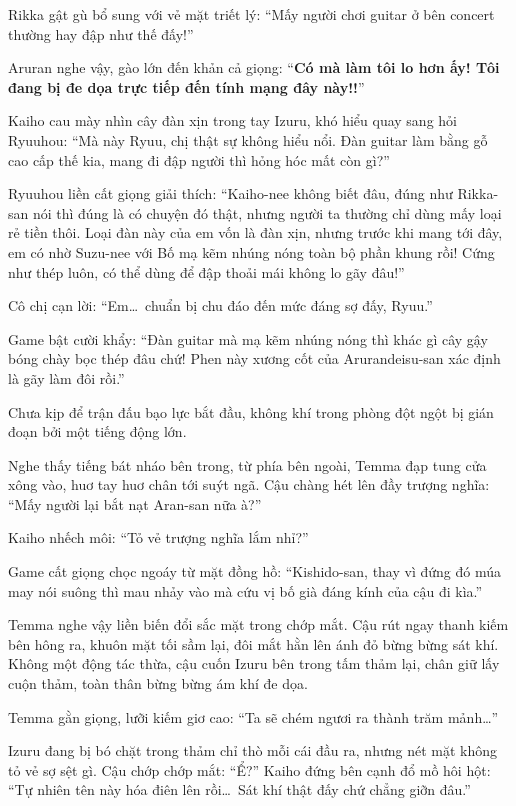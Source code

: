 \documentclass[../main.tex]{subfiles}
\begin{document}
Rikka gật gù bổ sung với vẻ mặt triết lý: ``Mấy người chơi guitar ở bên concert thường hay đập như thế đấy!''

Aruran nghe vậy, gào lớn đến khản cả giọng: ``\textbf{Có mà làm tôi lo hơn ấy! Tôi đang bị đe dọa trực tiếp đến tính mạng đây này!!}''

Kaiho cau mày nhìn cây đàn xịn trong tay Izuru, khó hiểu quay sang hỏi Ryuuhou: ``Mà này Ryuu, chị thật sự không hiểu nổi. Đàn guitar làm bằng gỗ cao cấp thế kia, mang đi đập người thì hỏng hóc mất còn gì?''

Ryuuhou liền cất giọng giải thích: ``Kaiho-nee không biết đâu, đúng như Rikka-san nói thì đúng là có chuyện đó thật, nhưng người ta thường chỉ dùng mấy loại rẻ tiền thôi. Loại đàn này của em vốn là đàn xịn, nhưng trước khi mang tới đây, em có nhờ Suzu-nee với Bố mạ kẽm nhúng nóng toàn bộ phần khung rồi! Cứng như thép luôn, có thể dùng để đập thoải mái không lo gãy đâu!''

Cô chị cạn lời: ``Em\dots\ chuẩn bị chu đáo đến mức đáng sợ đấy, Ryuu.''

Game bật cười khẩy: ``Đàn guitar mà mạ kẽm nhúng nóng thì khác gì cây gậy bóng chày bọc thép đâu chứ! Phen này xương cốt của Arurandeisu-san xác định là gãy làm đôi rồi.''

Chưa kịp để trận đấu bạo lực bắt đầu, không khí trong phòng đột ngột bị gián đoạn bởi một tiếng động lớn.

Nghe thấy tiếng bát nháo bên trong, từ phía bên ngoài, Temma đạp tung cửa xông vào, huơ tay huơ chân tới suýt ngã. Cậu chàng hét lên đầy trượng nghĩa: ``Mấy người lại bắt nạt Aran-san nữa à?''

Kaiho nhếch môi: ``Tỏ vẻ trượng nghĩa lắm nhỉ?''

Game cất giọng chọc ngoáy từ mặt đồng hồ: ``Kishido-san, thay vì đứng đó múa may nói suông thì mau nhảy vào mà cứu vị bố già đáng kính của cậu đi kìa.''

Temma nghe vậy liền biến đổi sắc mặt trong chớp mắt. Cậu rút ngay thanh kiếm bên hông ra, khuôn mặt tối sầm lại, đôi mắt hằn lên ánh đỏ bừng bừng sát khí. Không một động tác thừa, cậu cuốn Izuru bên trong tấm thảm lại, chân giữ lấy cuộn thảm, toàn thân bừng bừng ám khí đe dọa.

Temma gằn giọng, lưỡi kiếm giơ cao: ``Ta sẽ chém ngươi ra thành trăm mảnh\dots''

Izuru đang bị bó chặt trong thảm chỉ thò mỗi cái đầu ra, nhưng nét mặt không tỏ vẻ sợ sệt gì. Cậu chớp chớp mắt: ``Ể?'' Kaiho đứng bên cạnh đổ mồ hôi hột: ``Tự nhiên tên này hóa điên lên rồi\dots\ Sát khí thật đấy chứ chẳng giỡn đâu.''
\end{document}
